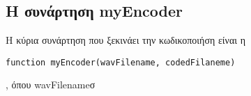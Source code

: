 \subsection{Η συνάρτηση myEncoder}
\par Η κύρια συνάρτηση που ξεκινάει την κωδικοποιήση είναι η 
\begin{lstlisting}[style=MyMatlab]
 function myEncoder(wavFilename, codedFilaneme)
\end{lstlisting}
, όπου wavFilenameσ


